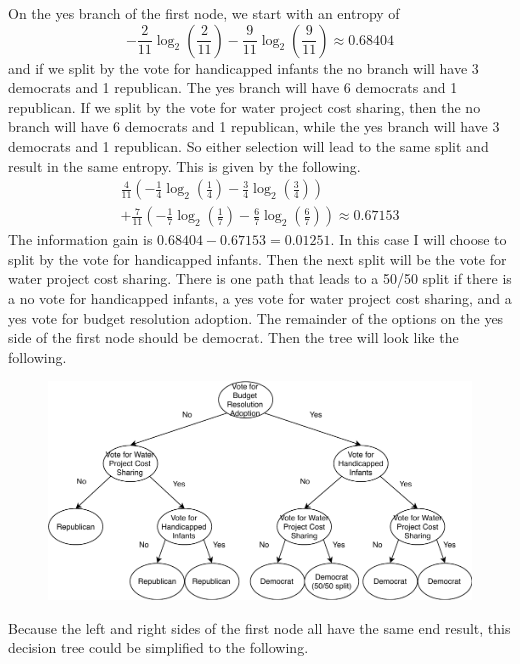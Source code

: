 \documentclass[12pt]{article}
\begin{document}
On the yes branch of the first node, we start with an entropy of
\[-\frac{2}{11}\log_2\left(\frac{2}{11}\right)-\frac{9}{11}\log_2\left(\frac{9}{11}\right)\approx0.68404\]
and if we split by the vote for handicapped infants the no branch will have 3 democrats and 1 republican. The yes branch will have
6 democrats and 1 republican. If we split by the vote for water project cost sharing, then the no branch will have 6 democrats
and 1 republican, while the yes branch will have 3 democrats and 1 republican. So either selection will lead to the same split
and result in the same entropy. This is given by the following.
\begin{multline*}
    \frac{4}{11}\left(-\frac{1}{4}\log_2\left(\frac{1}{4}\right)-\frac{3}{4}\log_2\left(\frac{3}{4}\right)\right)\\
    +\frac{7}{11}\left(-\frac{1}{7}\log_2\left(\frac{1}{7}\right)-\frac{6}{7}\log_2\left(\frac{6}{7}\right)\right)\approx 0.67153
\end{multline*}
The information gain is \(0.68404-0.67153=0.01251\). In this case I will choose to split by the vote for handicapped infants.
Then the next split will be the vote for water project cost sharing. There is one path that leads to a 50/50 split if there is a
no vote for handicapped infants, a yes vote for water project cost sharing, and a yes vote for budget resolution adoption. The remainder
of the options on the yes side of the first node should be democrat. Then the tree will look like the following.
\begin{figure}[H]
    \begin{center}
        \includegraphics[width=5in]{DecisionTree.pdf}
    \end{center}
\end{figure}
\pagebreak
Because the left and right sides of the first node all have the same end result, this decision tree could be simplified to the following.
\end{document}
